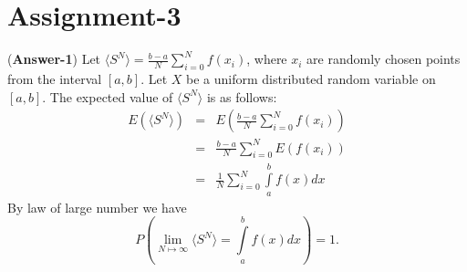 \documentclass[11pt,twoside,reqno]{article}
\newcommand{\e}{\exp}
\newcommand{\s}{\sigma}
\begin{document}
\begin{comment}
Now, let $X_1,...,X_n$ are $i.i.d$ random variable with mean $\mu$ and variance $\s$. The \textit{Central Limit Theorem} states 
\[
\bar{X} = \frac{\sum_{i=1}^{n} X_i-n \mu}{\s\sqrt{n}} \sim N(0,1) =: Y
\]
Assuming that $\phi_{\bar{X}}(t)$ exist, we will show it to be equal to $\phi_{Y}(t) = E[\e^{tY}] = \frac{t^2}{2}$.


Now, 
\begin{eqnarray*}
\phi_{\bar{X}}(t) &=& E[\e^{t\sum_{i=1}^n \frac{(X_i -\mu)}{\s\sqrt{n}}}] \\
&=& E[\prod e^{t\frac{(X_i -\mu)}{\s\sqrt{n}}}] \\
&=& \prod_{i=1}^{n} E[e^{t\frac{(X_i -\mu)}{\s\sqrt{n}}}] \\
&=& \left( E[e^{t\frac{(X_1 -\mu)}{\s\sqrt{n}}}] \right)^n \\
&=& \left( 1+  t\frac{(E[X_1] -\mu)}{\s\sqrt{n}} +  t^2\frac{E[(X_1 -\mu)^2]}{2( \s\sqrt{n})^2} + \ldots \right)^n \\
&\approx& \left(1 +  t^2\frac{\s^2}{2(\s\sqrt{n})^2} \right)^n \\
&=& \left(1 +    \frac{t^2}{2n} \right)^n 
\end{eqnarray*}
Taking $n \mapsto \infty$, we get $\e^{t^2/2}$. 

If we would have used $\Phi_{\bar{X}}(t)$ instead, we would have got $\left(1 -  \frac{t^2}{2n} \right)^n$ and further taking $n \mapsto \infty$, we get the limit to be $\e^{-t^2/2}$ which is $\Phi_{Y}(t)$. 
\end{comment}

\section{Assignment-3}


({\bf Answer-1})
Let $\langle S^N \rangle = \frac{b-a}{N}\sum\limits_{i=0}^{N} f(x_i)$, where $x_i$ are randomly chosen points from the interval $[a,b]$. Let $X$ be a uniform distributed random variable on $[a, b]$. 
The expected value of $\langle S^N \rangle$ is as follows:
\begin{eqnarray*}
E(\langle S^N \rangle) &=& E(\frac{b-a}{N}\sum\limits_{i=0}^{N} f(x_i)) \\
&=& \frac{b-a}{N}\sum\limits_{i=0}^{N} E( f(x_i)) \\
&=& \frac{1}{N}\sum\limits_{i=0}^{N} \int\limits_{a}^b f(x)dx
\end{eqnarray*}
By law of large number we have 
\[
P\left(\lim\limits_{N \mapsto \infty} \langle S^N \rangle = \int\limits_{a}^b f(x)dx \right) = 1.
\]
\end{document}
